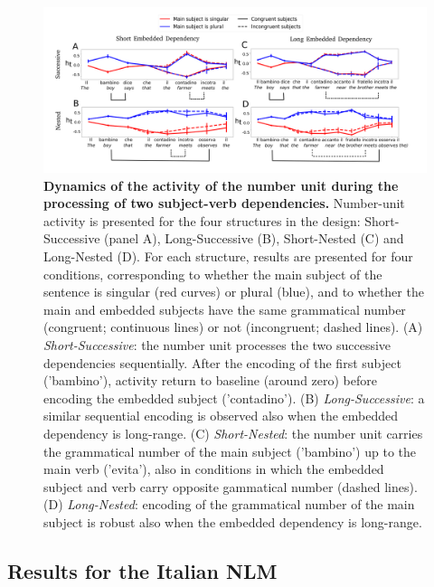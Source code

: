 \begin{figure}[ht]
    \centering
    \includegraphics[width=\textwidth, clip, trim={0mm 0mm 0mm 0mm}]{figures/model_activations_2by2.png}
    \caption{\textbf{Dynamics of the activity of the number unit during the processing of two subject-verb dependencies.} Number-unit activity is presented for the four structures in the design: Short-Successive (panel A), Long-Successive (B), Short-Nested (C) and Long-Nested (D). For each structure, results are presented for four conditions, corresponding to whether the main subject of the sentence is singular (red curves) or plural (blue), and to whether the main and embedded subjects have the same grammatical number (congruent; continuous lines) or not (incongruent; dashed lines). (A) \textit{Short-Successive}: the number unit processes the two successive dependencies sequentially. After the encoding of the first subject ('bambino'), activity return to baseline (around zero) before encoding the embedded subject ('contadino'). (B) \textit{Long-Successive}: a similar sequential encoding is observed also when the embedded dependency is long-range. (C) \textit{Short-Nested}: the number unit carries the grammatical number of the main subject ('bambino') up to the main verb ('evita'), also in conditions in which the embedded subject and verb carry opposite gammatical number (dashed lines). (D) \textit{Long-Nested}: encoding of the grammatical number of the main subject is robust also when the embedded dependency is long-range.}
    \label{fig:2by2_dynamics}
\end{figure}




\subsection{Results for the Italian NLM}
